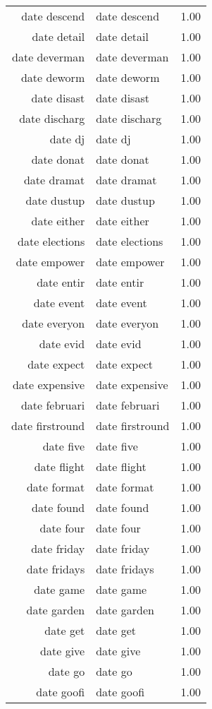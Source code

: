 \begin{table}[ht]
\begin{tabular}{rlr}
  date descend & date descend & 1.00 \\ 
  date detail & date detail & 1.00 \\ 
  date deverman & date deverman & 1.00 \\ 
  date deworm & date deworm & 1.00 \\ 
  date disast & date disast & 1.00 \\ 
  date discharg & date discharg & 1.00 \\ 
  date dj & date dj & 1.00 \\ 
  date donat & date donat & 1.00 \\ 
  date dramat & date dramat & 1.00 \\ 
  date dustup & date dustup & 1.00 \\ 
  date either & date either & 1.00 \\ 
  date elections & date elections & 1.00 \\ 
  date empower & date empower & 1.00 \\ 
  date entir & date entir & 1.00 \\ 
  date event & date event & 1.00 \\ 
  date everyon & date everyon & 1.00 \\ 
  date evid & date evid & 1.00 \\ 
  date expect & date expect & 1.00 \\ 
  date expensive & date expensive & 1.00 \\ 
  date februari & date februari & 1.00 \\ 
  date firstround & date firstround & 1.00 \\ 
  date five & date five & 1.00 \\ 
  date flight & date flight & 1.00 \\ 
  date format & date format & 1.00 \\ 
  date found & date found & 1.00 \\ 
  date four & date four & 1.00 \\ 
  date friday & date friday & 1.00 \\ 
  date fridays & date fridays & 1.00 \\ 
  date game & date game & 1.00 \\ 
  date garden & date garden & 1.00 \\ 
  date get & date get & 1.00 \\ 
  date give & date give & 1.00 \\ 
  date go & date go & 1.00 \\ 
  date goofi & date goofi & 1.00 \\ 

\end{tabular}
\end{table}
